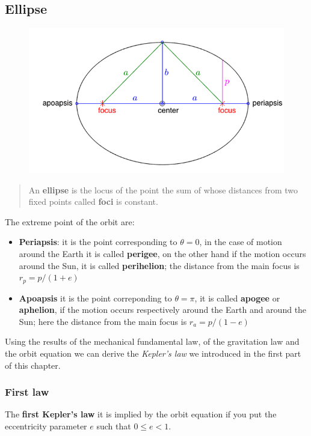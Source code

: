 \subsection{Ellipse}
\begin{figure}[h]
    \centering
    \includegraphics[scale=0.6]{AerospaceApplications/images/ellipse.png}
\end{figure}
\begin{quotation}
    \color{red}
    An \textbf{ellipse} is the locus of the point the sum of whose distances from two fixed points called \textbf{foci} is constant. 
\end{quotation}
The extreme point of the orbit are:
\begin{itemize}
    \item \textbf{Periapsis}: it is the point corresponding to $\theta=0$, in the case of motion around the Earth it is called \textbf{perigee}, on the other hand if the motion occurs around the Sun, it is called \textbf{perihelion}; the distance from the main focus is $r_p = p/(1+e)$
    \item \textbf{Apoapsis} it is the point correponding to $\theta=\pi$, it is called \textbf{apogee} or \textbf{aphelion}, if the motion occurs respectively around the Earth and around the Sun; here the distance from the main focus is $r_a = p/(1-e)$
\end{itemize}

Using the results of the mechanical fundamental law, of the gravitation law and the orbit equation we can derive the \textit{Kepler's law} we introduced in the first part of this  chapter.

\subsubsection{First law}
The \textbf{first Kepler's law} it is implied by the orbit equation if you put the eccentricity parameter $e$ such that $0 \le e < 1$.

